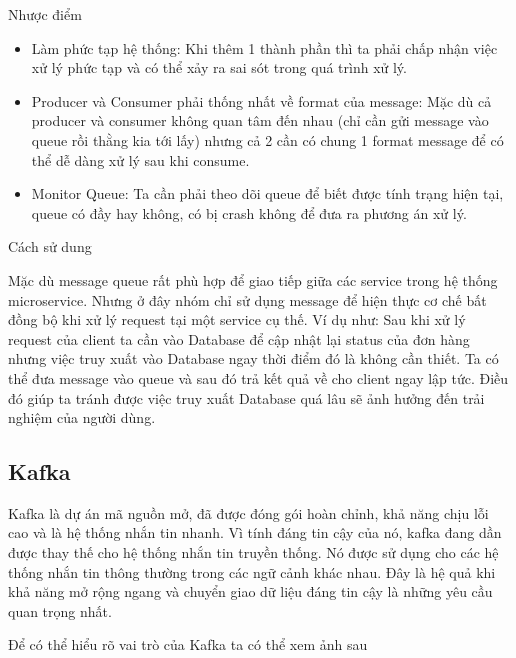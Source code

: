 \begin{itemize}
            Nhược điểm
            
            \begin{itemize}
                \item Làm phức tạp hệ thống: Khi thêm 1 thành phần thì ta phải chấp nhận việc xử lý phức tạp và có thể xảy ra sai sót trong quá trình xử lý.
                \item Producer và Consumer phải thống nhất về format của message: Mặc dù cả producer và consumer không quan tâm đến nhau (chỉ cần gửi message vào queue rồi thằng kia tới lấy) nhưng cả 2 cần có chung 1 format message để có thể dễ dàng xử lý sau khi consume.
                \item Monitor Queue: Ta cần phải theo dõi queue để biết được tính trạng hiện tại, queue có đầy hay không, có bị crash không để đưa ra phương án xử lý.
            \end{itemize}
            
            Cách sử dung
            
            Mặc dù message queue rất phù hợp để giao tiếp giữa các service trong hệ thống microservice. Nhưng ở đây nhóm chỉ sử dụng message để hiện thực cơ chế bất đồng bộ khi xử lý request tại một service cụ thế. Ví dụ như: Sau khi xử lý request của client ta cần vào Database để cập nhật lại status của đơn hàng nhưng việc truy xuất vào Database ngay thời điểm đó là không cần thiết. Ta có thể đưa message vào queue và sau đó trả kết quả về cho client ngay lập tức. Điều đó giúp ta tránh được việc truy xuất Database quá lâu sẽ ảnh hưởng đến trải nghiệm của người dùng.
            
            \subsection{Kafka}
            
            Kafka là dự án mã nguồn mở, đã được đóng gói hoàn chỉnh, khả năng chịu lỗi cao và là hệ thống nhắn tin nhanh. Vì tính đáng tin cậy của nó, kafka đang dần được thay thế cho hệ thống nhắn tin truyền thống. Nó được sử dụng cho các hệ thống nhắn tin thông thường trong các ngữ cảnh khác nhau. Đây là hệ quả khi khả năng mở rộng ngang và chuyển giao dữ liệu đáng tin cậy là những yêu cầu quan trọng nhất.
            
            Để có thể hiểu rõ vai trò của Kafka ta có thể xem ảnh sau
            

\end{itemize}
